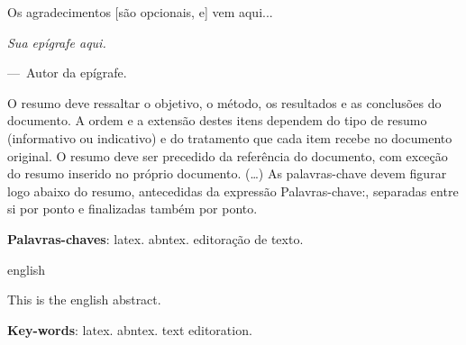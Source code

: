 \documentclass[
	12pt,				%
	openright,			%
	oneside,			%
	a4paper,			%
	english,			%
	brazil				%
	]{abntex2}
\begin{document}
\imprimirfolhaderosto

%     


\begin{folhadeaprovacao}

\end{folhadeaprovacao}


\begin{agradecimentos}
\noindent Os agradecimentos [são opcionais, e] vem aqui...
\end{agradecimentos}

\begin{epigrafe}
    \vspace*{\fill}
\epigraph{\textsl{Sua epígrafe aqui.}}{---~Autor da epígrafe.}
\end{epigrafe}


\setlength{\absparsep}{18pt} %
\begin{resumo}
 \noindent O resumo deve ressaltar o objetivo, o método, os resultados e as conclusões do documento. A ordem e a extensão
 destes itens dependem do tipo de resumo (informativo ou indicativo) e do tratamento que cada item recebe no documento original. O resumo deve ser precedido da referência do documento, com exceção do resumo inserido no
 próprio documento. (\ldots) As palavras-chave devem figurar logo abaixo do resumo, antecedidas da expressão Palavras-chave:, separadas entre si por
 ponto e finalizadas também por ponto.

 \textbf{Palavras-chaves}: latex. abntex. editoração de texto.
\end{resumo}

\begin{resumo}[Abstract]
 \begin{otherlanguage*}{english}

\noindent This is the english abstract.

   \vspace{\onelineskip}

   \noindent
   \textbf{Key-words}: latex. abntex. text editoration.
 \end{otherlanguage*}
\end{resumo}
\end{document}
